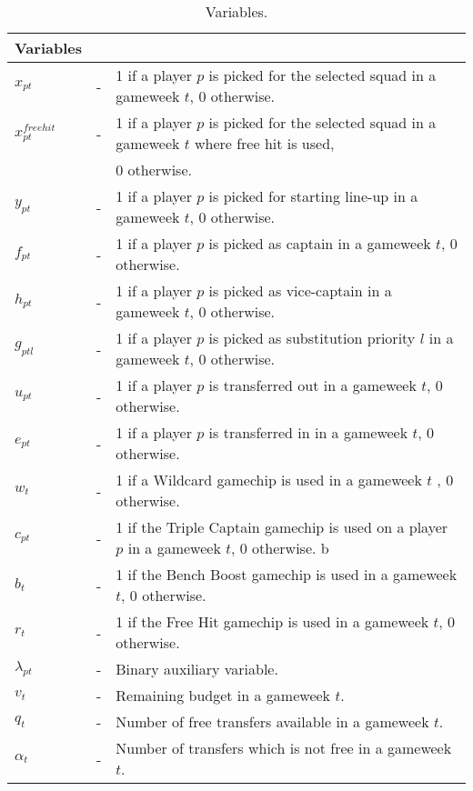 \begin{table}[H]
\tabcolsep=0.11cm
\centering
\caption{Variables.}
\begin{tabular}{@{}lll@{}}
\toprule
Variables    &   &                                                                                                    \\ \midrule
${x_{pt}}$   & - & 1 if a player $p$ is picked for the  selected squad in a gameweek $t$, 0 otherwise.       \\
${x^{free hit}_{pt}}$   & - & 1 if a player $p$ is picked for the selected squad in a gameweek $t$ where free hit is used,    \\
             &   &     0 otherwise.     \\
$y_{pt}$     & - & 1 if a player $p$ is picked for starting line-up in a gameweek $t$, 0 otherwise.                    \\
$f_{pt}$     & - & 1 if a player $p$ is picked as captain in a gameweek $t$, 0 otherwise.                             \\
$h_{pt}$     & - & 1 if a player $p$ is picked as vice-captain in a gameweek $t$, 0 otherwise.                         \\
$g_{ptl}$    & - & 1 if a player $p$ is picked as substitution priority $l$ in a gameweek $t$, 0 otherwise. \\
$u_{pt}$     & - & 1 if a player $p$ is transferred out in a gameweek $t$, 0 otherwise.                               \\
$e_{pt}$     & - & 1 if a player $p$ is transferred in in a gameweek $t$, 0 otherwise.                                   \\
$w_{t}$     & - & 1 if a Wildcard gamechip is used in a gameweek $t$ , 0 otherwise.                                   \\
$c_{pt}$     & - & 1 if the Triple Captain gamechip is used on a player $p$ in a gameweek $t$, 0 otherwise.            b        \\
$b_{t}$     & - & 1 if the Bench Boost gamechip is used in a gameweek $t$, 0 otherwise.                                   \\
$r_{t}$     & - & 1 if the Free Hit gamechip is used in a gameweek $t$, 0 otherwise.                                   \\
${\lambda_{pt}}$   & - & Binary auxiliary variable.      \\
$v_{t}$      & - & Remaining budget in a gameweek $t$.                                                                \\
$q_{t}$      & - & Number of  free transfers available in a gameweek $t$.                                             \\
$\alpha_{t}$ & - & Number of transfers which is not free in a gameweek $t$.                                      \\ \bottomrule
\end{tabular}
\end{table}
   
